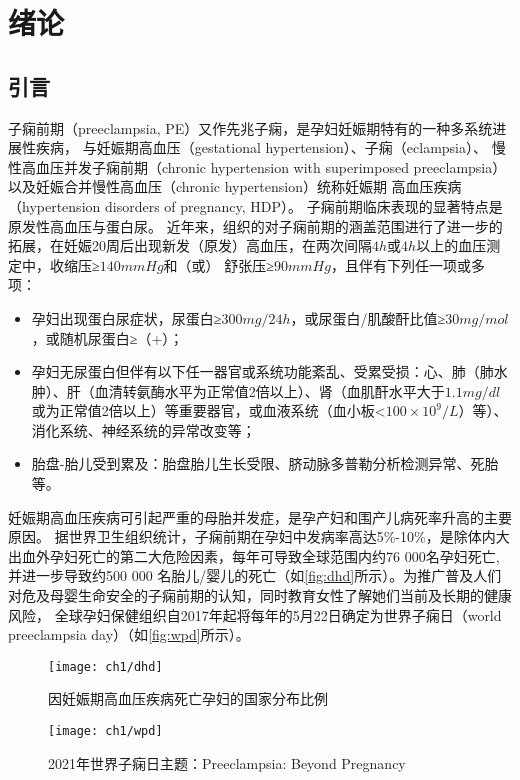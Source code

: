 \chapter{绪论}

\section{引言}
子痫前期（preeclampsia, PE）又作先兆子痫，是孕妇妊娠期特有的一种多系统进展性疾病， 与妊娠期高血压（gestational hypertension）、子痫（eclampsia）、
慢性高血压并发子痫前期（chronic hypertension with superimposed preeclampsia）以及妊娠合并慢性高血压（chronic hypertension）统称妊娠期
高血压疾病（hypertension disorders of pregnancy, HDP）\cite{OAG9,HDASOM,2000s1}。
子痫前期临床表现的显著特点是原发性高血压与蛋白尿。
近年来，组织的对子痫前期的涵盖范围进行了进一步的拓展，在妊娠20周后出现新发（原发）高血压，在两次间隔$4h$或$4h$以上的血压测定中，收缩压≥$140mmHg$和（或）
舒张压≥$90mmHg$，且伴有下列任一项或多项\cite{OAG9,FIGO}：
\begin{itemize}
    \item 孕妇出现蛋白尿症状，尿蛋白≥$300mg/24h$，或尿蛋白/肌酸酐比值≥$30mg/mol$，或随机尿蛋白≥（+）；
    \item 孕妇无尿蛋白但伴有以下任一器官或系统功能紊乱、受累受损：心、肺（肺水肿）、肝（血清转氨酶水平为正常值2倍以上）、肾（血肌酐水平大于$1.1mg/dl$
    或为正常值2倍以上）等重要器官，或血液系统（血小板<$100 \times 10^{9}/L$）等）、消化系统、神经系统的异常改变等；
    \item 胎盘-胎儿受到累及：胎盘胎儿生长受限、脐动脉多普勒分析检测异常、死胎等。 
\end{itemize}

妊娠期高血压疾病可引起严重的母胎并发症，是孕产妇和围产儿病死率升高的主要原因\cite{OAG9}。
据世界卫生组织统计，子痫前期在孕妇中发病率高达5\%-10\%，是除体内大出血外孕妇死亡的第二大危险因素\cite{LCT2006}，每年可导致全球范围内约76 000名孕妇死亡,并进一步导致约500 000
名胎儿/婴儿的死亡\cite{DAM2015,LCT2006}（如\autoref{fig:dhd}所示）。为推广普及人们对危及母婴生命安全的子痫前期的认知，同时教育女性了解她们当前及长期的健康风险，
全球孕妇保健组织自2017年起将每年的5月22日确定为世界子痫日（world preeclampsia day）（如\autoref{fig:wpd}所示）。
\begin{figure}[htb]
    \centering
    \texttt{[image: ch1/dhd]}
    \caption{\label{fig:dhd}因妊娠期高血压疾病死亡孕妇的国家分布比例}
\end{figure}
\begin{figure}[htb]
    \centering
    \texttt{[image: ch1/wpd]}
    \caption{\label{fig:wpd}2021年世界子痫日主题：Preeclampsia: Beyond Pregnancy}
\end{figure}

